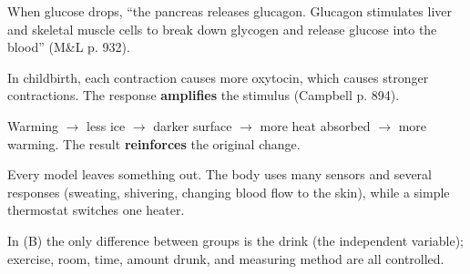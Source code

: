 \documentclass[11pt,letterpaper]{article}
\begin{document}
When glucose drops, ``the pancreas releases glucagon. Glucagon stimulates liver and skeletal muscle cells to break down glycogen and release glucose into the blood'' (M\&L p. 932).
\begin{whynot}
\end{whynot}

In childbirth, each contraction causes more oxytocin, which causes stronger contractions. The response \textbf{amplifies} the stimulus (Campbell p. 894).
\begin{whynot}
\end{whynot}

Warming $\rightarrow$ less ice $\rightarrow$ darker surface $\rightarrow$ more heat absorbed $\rightarrow$ more warming. The result \textbf{reinforces} the original change.
\begin{whynot}
\end{whynot}

Every model leaves something out. The body uses many sensors and several responses (sweating, shivering, changing blood flow to the skin), while a simple thermostat switches one heater.
\begin{whynot}
\end{whynot}

In (B) the only difference between groups is the drink (the independent variable); exercise, room, time, amount drunk, and measuring method are all controlled.
\begin{whynot}
\end{whynot}

\end{document}
